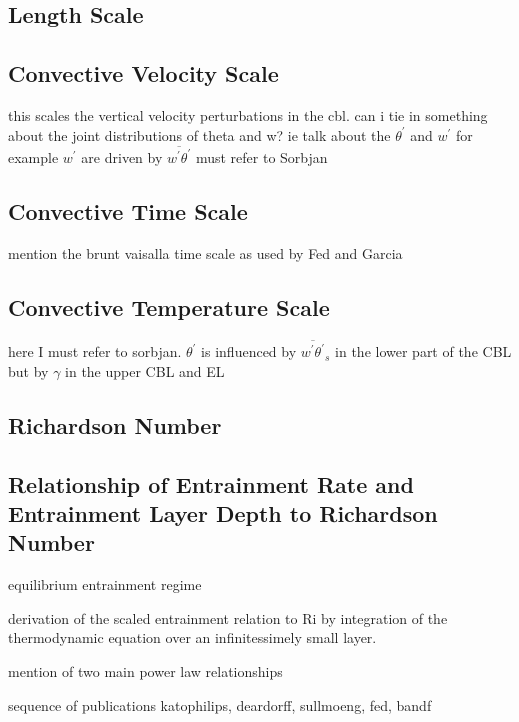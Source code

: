 \subsection{Length Scale}
\label{subsec:}


\subsection{Convective Velocity Scale}
\label{subsec:}

this scales the vertical velocity perturbations in the cbl. 
can i tie in something about the joint distributions of theta and w?
ie talk about the $\theta^{'}$ and $w^{'}$
for example $w^{'}$ are driven by $\overline{w^{'}\theta^{'}}$
must refer to Sorbjan

\subsection{Convective Time Scale}
\label{}

 mention the brunt vaisalla time scale as used by Fed and Garcia

\subsection{Convective Temperature Scale}
\label{}

here I must refer to sorbjan.  $\theta^{'}$ is influenced by $\overline{w^{'}\theta^{'}}_{s}$
in the lower part of the \acs{CBL} but by $\gamma$ in the upper \acs{CBL} and \acs{EL}

\subsection{Richardson Number}
\label{}

\subsection{Relationship of Entrainment Rate and Entrainment Layer Depth to Richardson Number}

equilibrium entrainment regime

derivation of the scaled entrainment relation to Ri by integration of the thermodynamic equation over an infinitessimely small layer.

mention of two main power law relationships

sequence of publications katophilips, deardorff, sullmoeng, fed, bandf

